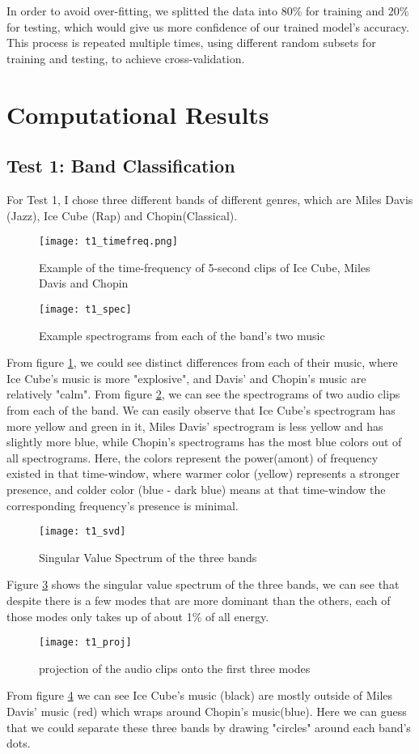 \documentclass[12pt, a4paper]{article}
\begin{document}
In order to avoid over-fitting, we splitted the data into 80\% for training and 20\% for testing, which would give us more confidence of our trained model's accuracy. This process is repeated multiple times, using different random subsets for training and testing, to achieve cross-validation.

\section{Computational Results}
\subsection{Test 1: Band Classification}
For Test 1, I chose three different bands of different genres, which are Miles Davis (Jazz), Ice Cube (Rap) and Chopin(Classical).

\begin{figure}[H]
\centering
\texttt{[image: t1\_timefreq.png]}
\caption{Example of the time-frequency of 5-second clips of Ice Cube, Miles Davis and Chopin}
\label{fig:t11}
\end{figure}
\begin{figure}[H]
\centering
\texttt{[image: t1\_spec]}
\caption{Example spectrograms from each of the band's two music}
\label{fig:t12}
\end{figure}
From figure \ref{fig:t11}, we could see distinct differences from each of their music, where Ice Cube's music is more "explosive", and Davis' and Chopin's music are relatively "calm". From figure \ref{fig:t12}, we can see the spectrograms of two audio clips from each of the band. We can easily observe that Ice Cube's spectrogram has more yellow and green in it, Miles Davis' spectrogram is less yellow and has slightly more blue, while Chopin's spectrograms has the most blue colors out of all spectrograms. Here, the colors represent the power(amont) of frequency existed in that time-window, where warmer color (yellow) represents a stronger presence, and colder color (blue - dark blue) means at that time-window the corresponding frequency's presence is minimal.
\begin{figure}[H]
\centering
\texttt{[image: t1\_svd]}
\caption{Singular Value Spectrum of the three bands}
\label{fig:t13}
\end{figure}
Figure \ref{fig:t13} shows the singular value spectrum of the three bands, we can see that despite there is a few modes that are more dominant than the others, each of those modes only takes up of about 1\% of all energy.
\begin{figure}[H]
\centering
\texttt{[image: t1\_proj]}
\caption{projection of the audio clips onto the first three modes}
\label{fig:t14}
\end{figure}
From figure \ref{fig:t14} we can see Ice Cube's music (black) are mostly outside of Miles Davis' music (red) which wraps around Chopin's music(blue). Here we can guess that we could separate these three bands by drawing "circles" around each band's dots.
\end{document}
